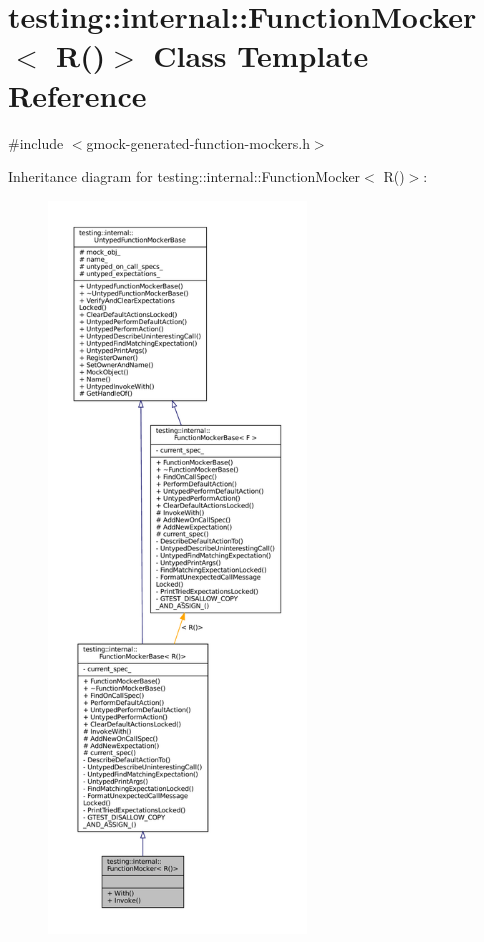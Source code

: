 \hypertarget{classtesting_1_1internal_1_1FunctionMocker_3_01R_07_08_4}{}\section{testing\+:\+:internal\+:\+:Function\+Mocker$<$ R()$>$ Class Template Reference}
\label{classtesting_1_1internal_1_1FunctionMocker_3_01R_07_08_4}


{\ttfamily \#include $<$gmock-\/generated-\/function-\/mockers.\+h$>$}



Inheritance diagram for testing\+:\+:internal\+:\+:Function\+Mocker$<$ R()$>$\+:
\nopagebreak
\begin{figure}[H]
\begin{center}
\leavevmode
\includegraphics[height=550pt]{classtesting_1_1internal_1_1FunctionMocker_3_01R_07_08_4__inherit__graph}
\end{center}
\end{figure}


